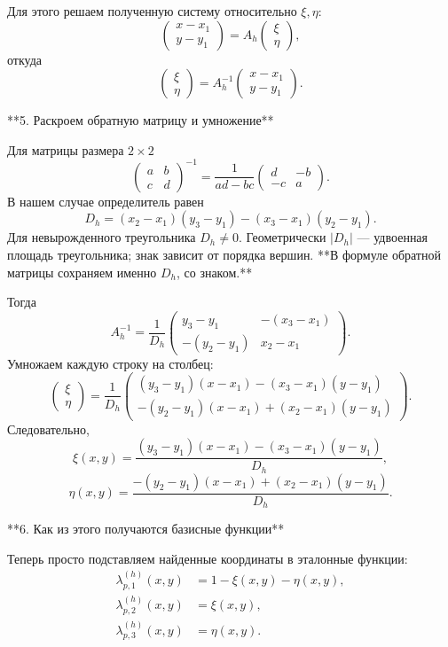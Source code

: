 \documentclass[a4paper,14pt]{extarticle}
\begin{document}
	Для этого решаем полученную систему относительно \(\xi,\eta\):
	\[
	\begin{pmatrix}x-x_1\\y-y_1\end{pmatrix}
	=
	A_h\begin{pmatrix}\xi\\\eta\end{pmatrix},
	\]
	откуда
	\[
	\begin{pmatrix}\xi\\\eta\end{pmatrix}
	=
	A_h^{-1}
	\begin{pmatrix}x-x_1\\y-y_1\end{pmatrix}.
	\]
	
	**5. Раскроем обратную матрицу и умножение**
	
	Для матрицы размера \(2\times2\)
	\[
	\begin{pmatrix}a&b\\c&d\end{pmatrix}^{-1}
	=
	\frac1{ad-bc}
	\begin{pmatrix}d&-b\\-c&a\end{pmatrix}.
	\]
	В нашем случае определитель равен
	\[
	D_h=(x_2-x_1)(y_3-y_1)
	-(x_3-x_1)(y_2-y_1).
	\]
	Для невырожденного треугольника \(D_h\ne0\). Геометрически \(|D_h|\) — удвоенная площадь треугольника; знак зависит от порядка вершин. **В формуле обратной матрицы сохраняем именно \(D_h\), со знаком.**
	
	Тогда
	\[
	A_h^{-1}
	=
	\frac1{D_h}
	\begin{pmatrix}
		y_3-y_1&-(x_3-x_1)\\
		-(y_2-y_1)&x_2-x_1
	\end{pmatrix}.
	\]
	Умножаем каждую строку на столбец:
	\[
	\begin{pmatrix}\xi\\\eta\end{pmatrix}
	=
	\frac1{D_h}
	\begin{pmatrix}
		(y_3-y_1)(x-x_1)-(x_3-x_1)(y-y_1)\\
		-(y_2-y_1)(x-x_1)+(x_2-x_1)(y-y_1)
	\end{pmatrix}.
	\]
	Следовательно,
	\[
	\boxed{
		\xi(x,y)=
		\frac{(y_3-y_1)(x-x_1)-(x_3-x_1)(y-y_1)}{D_h},
	}
	\]
	\[
	\boxed{
		\eta(x,y)=
		\frac{-(y_2-y_1)(x-x_1)+(x_2-x_1)(y-y_1)}{D_h}.
	}
	\]
	
	**6. Как из этого получаются базисные функции**
	
	Теперь просто подставляем найденные координаты в эталонные функции:
	\[
	\boxed{
		\begin{aligned}
			\lambda_{p,1}^{(h)}(x,y)&=1-\xi(x,y)-\eta(x,y),\\
			\lambda_{p,2}^{(h)}(x,y)&=\xi(x,y),\\
			\lambda_{p,3}^{(h)}(x,y)&=\eta(x,y).
		\end{aligned}
	}
	\]
	
\end{document}
